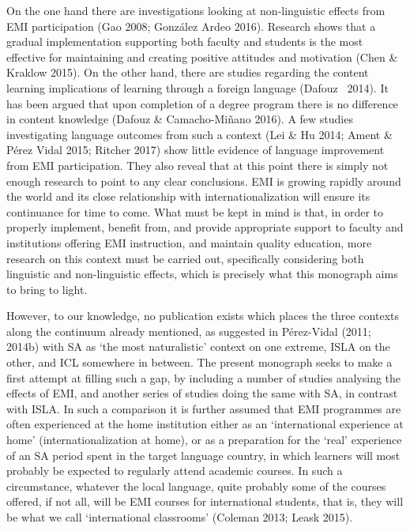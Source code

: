 \begin{styleStandard}
On the one hand there are investigations looking at non-linguistic effects from EMI participation (Gao 2008; González Ardeo 2016). Research shows that a gradual implementation supporting both faculty and students is the most effective for maintaining and creating positive attitudes and motivation (Chen \& Kraklow 2015). On the other hand, there are studies regarding the content learning implications of learning through a foreign language (Dafouz \ 2014). It has been argued that upon completion of a degree program there is no difference in content knowledge (Dafouz \& Camacho-Miñano 2016). A few studies investigating language outcomes from such a context (Lei \& Hu 2014; Ament \& Pérez Vidal 2015; Ritcher 2017) show little evidence of language improvement from EMI participation. They also reveal that at this point there is simply not enough research to point to any clear conclusions. EMI is growing rapidly around the world and its close relationship with internationalization will ensure its continuance for time to come. What must be kept in mind is that, in order to properly implement, benefit from, and provide appropriate support to faculty and institutions offering EMI instruction, and maintain quality education, more research on this context must be carried out, specifically considering both linguistic and non-linguistic effects, which is precisely what this monograph aims to bring to light. 
\end{styleStandard}

\begin{styleStandard}
However, to our knowledge, no publication exists which places the three contexts along the continuum already mentioned, as suggested in Pérez-Vidal (2011; 2014b) with SA as ‘the most naturalistic’ context on one extreme, ISLA on the other, and ICL somewhere in between. The present monograph seeks to make a first attempt at filling such a gap, by including a number of studies analysing the effects of EMI, and another series of studies doing the same with SA, in contrast with ISLA. In such a comparison it is further assumed that EMI programmes are often experienced at the home institution either as an ‘international experience at home’ (internationalization at home), or as a preparation for the ‘real’ experience of an SA period spent in the target language country, in which learners will most probably be expected to regularly attend academic courses. In such a circumstance, whatever the local language, quite probably some of the courses offered, if not all, will be EMI courses for international students, that is, they will be what we call ‘international classrooms’ (Coleman 2013; Leask 2015). 
\end{styleStandard}

